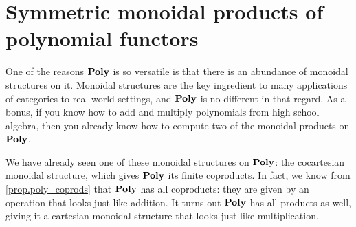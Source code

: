 \documentclass[Book-Poly]{subfiles}
\begin{document}


\section{Symmetric monoidal products of polynomial functors} \label{sec.poly.cat.monoidal}


One of the reasons $\mathbf{Poly}$ is so versatile is that there is an abundance of monoidal structures on it.
Monoidal structures are the key ingredient to many applications of categories to real-world settings, and $\mathbf{Poly}$ is no different in that regard.
As a bonus, if you know how to add and multiply polynomials from high school algebra, then you already know how to compute two of the monoidal products on $\mathbf{Poly}$.

We have already seen one of these monoidal structures on $\mathbf{Poly}$: the cocartesian monoidal structure, which gives $\mathbf{Poly}$ its finite coproducts.
In fact, we know from \cref{prop.poly_coprods} that $\mathbf{Poly}$ has all coproducts: they are given by an operation that looks just like addition.
It turns out $\mathbf{Poly}$ has all products as well, giving it a cartesian monoidal structure that looks just like multiplication.

\end{document}
